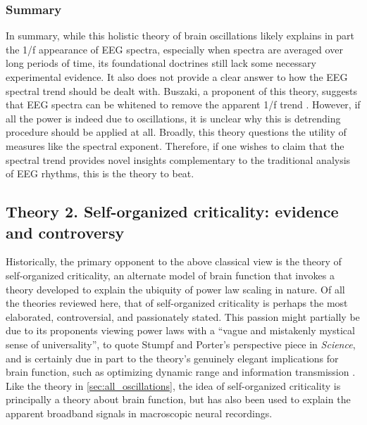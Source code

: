 \subsubsection{Summary}
In summary, while this holistic theory of brain oscillations likely explains in part the 1/f appearance of EEG spectra, especially when spectra are averaged over long periods of time, its foundational doctrines still lack some necessary experimental evidence. It also does not provide a clear answer to how the EEG spectral trend should be dealt with. Buszaki, a proponent of this theory, suggests that EEG spectra can be whitened to remove the apparent 1/f trend \cite{Buzsaki2006}. However, if all the power is indeed due to oscillations, it is unclear why this is detrending procedure should be applied at all. Broadly, this theory questions the utility of measures like the spectral exponent. Therefore, if one wishes to claim that the spectral trend provides novel insights complementary to the traditional analysis of EEG rhythms, this is the theory to beat.

\subsection{Theory 2. Self-organized criticality: evidence and controversy} \label{sec:SOC}

Historically, the primary opponent to the above classical view is the theory of self-organized criticality, an alternate model of brain function that invokes a theory developed to explain the ubiquity of power law scaling in nature. Of all the theories reviewed here, that of self-organized criticality is perhaps the most elaborated, controversial, and passionately stated. This passion might partially be due to its proponents viewing power laws with a ``vague and mistakenly mystical sense of universality'', to quote Stumpf and Porter’s perspective piece in \textit{Science}\cite{Stumpf2012}, and is certainly due in part to the theory’s genuinely elegant implications for brain function, such as optimizing dynamic range \cite{Kinouchi2006} and information transmission \cite{Shriki2016}. Like the theory in \autoref{sec:all_oscillations}, the idea of self-organized criticality is principally a theory about brain function, but has also been used to explain the apparent broadband signals in macroscopic neural recordings. 

